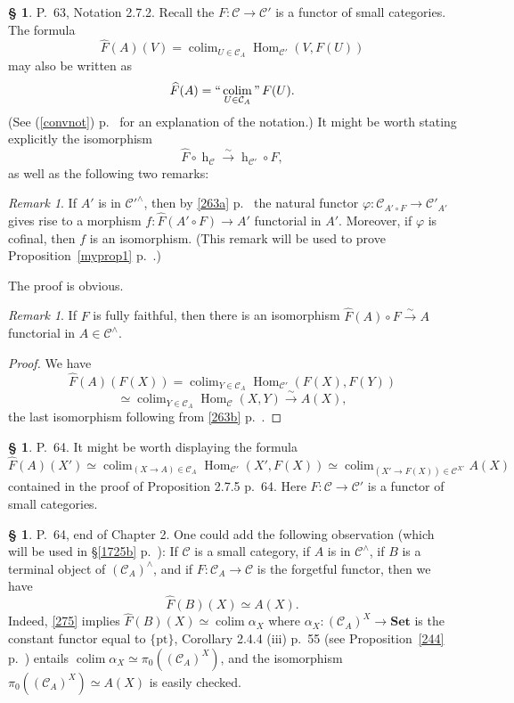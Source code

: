 \documentclass[12pt]{article}
\theoremstyle{remark}
\newtheorem{rk}[thm]{Remark}
\theoremstyle{definition}
\newtheorem{s}[thm]{\S}
\newcommand{\cc}{\mathcal}
\newcommand{\C}{\mathcal C}
\newcommand{\Set}{\mathbf{Set}}
\newcommand{\pt}{\{\text{pt}\}}
\newcommand{\cn}{(See (\ref{convnot}) p.~\pageref{convnot} for an explanation of the notation.) }%
\newcommand{\xr}{\xrightarrow}
\DeclareMathOperator*{\coli}{colim}
\DeclareMathOperator*{\co}{colim}
\DeclareMathOperator*{\icolim}{``\coli"}
\DeclareMathOperator{\hy}{h}
\DeclareMathOperator{\Hom}{Hom}%
\begin{document}
%
%
\begin{s} 
P.~63, Notation 2.7.2. Recall the $F:\C\to\C'$ is a functor of small categories. The formula 
$$
\widehat F(A)(V)=\coli_{U\in\C_A}\Hom_{\C'}(V,F(U))
$$
may also be written as 
$$
\widehat F(A)=\icolim_{U\in\C_A}F(U).
$$
\cn It might be worth stating explicitly the isomorphism 
$$
\widehat F\circ\hy_\C\xr\sim\hy_{\C'}\circ F,
$$
as well as the following two remarks:
%
\begin{rk}\label{cof}
If $A'$ is in $\cc C'^\wedge$, then by \eqref{263a} p.~\pageref{263a} the natural functor $\varphi:\cc C_{A'\circ F}\to\cc C'_{A'}$ gives rise to a morphism $f:\widehat F(A'\circ F)\to A'$ functorial in $A'$. Moreover, if $\varphi$ is cofinal, then $f$ is an isomorphism. (This remark will be used to prove Proposition~\ref{myprop1} p.~\pageref{myprop1}.)
\end{rk}

The proof is obvious.
%
\begin{rk}
If $F$ is fully faithful, then there is an isomorphism $\widehat F(A)\circ F\xr\sim A$ functorial in $A\in\C^\wedge$.
\end{rk} 
%
\begin{proof}
We have 
$$
\widehat F(A)(F(X))=\coli_{Y\in\C_A}\Hom_{\C'}(F(X),F(Y))
$$
$$
\simeq\coli_{Y\in\C_A}\Hom_\C(X,Y)\xr\sim A(X),
$$
the last isomorphism following from \eqref{263b} p.~\pageref{263b}.
\end{proof}
\end{s}
%
\begin{s} 
P.~64. It might be worth displaying the formula 
\begin{equation}\label{275}
\widehat F(A)(X')\simeq\co_{(X\to A)\in\C_A}\Hom_{\C'}(X',F(X))\simeq
\co_{(X'\to F(X))\in\C^{X'}}A(X)
\end{equation}
contained in the proof of Proposition 2.7.5 p.~64. Here $F:\C\to\C'$ is a functor of small categories. 
\end{s}
%
%
\begin{s}
P.~64, end of Chapter 2. One could add the following observation (which will be used in \S\ref{1725b} p.~\pageref{1725b}): If $\C$ is a small category, if $A$ is in $\C^\wedge$, if $B$ is a terminal object of $(\C_A)^\wedge$, and if $F:\C_A\to\C$ is the forgetful functor, then we have 
\begin{equation}\label{1725}
\widehat F(B)(X)\simeq A(X).
\end{equation}
Indeed, \eqref{275} implies $\widehat F(B)(X)\simeq\co\alpha_X$ where $\alpha_X:(\C_A)^X\to\Set$ is the constant functor equal to $\pt$, Corollary 2.4.4 (iii) p.~55 (see Proposition~\ref{244} p.~\pageref{244}) entails $\co\alpha_X\simeq\pi_0((\C_A)^X)$, and the isomorphism $\pi_0((\C_A)^X)\simeq A(X)$ is easily checked.
\end{s}
\end{document}
